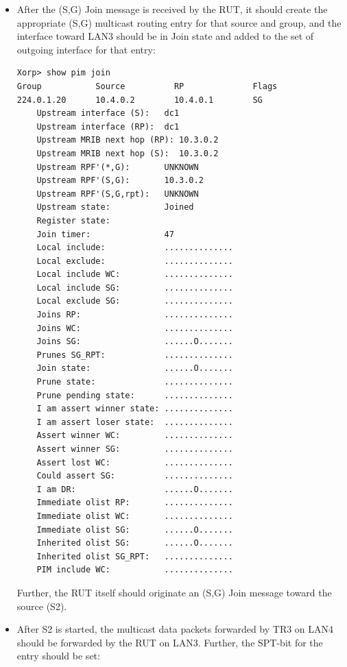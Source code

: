 \documentclass[11pt]{report}
\begin{document}
\begin{itemize}

  \item After the (S,G) Join message is received by the RUT, it
  should create the appropriate (S,G) multicast routing entry for
  that source and group, and the interface toward LAN3 should be in Join state
  and added to the set of outgoing interface for that entry:

\begin{verbatim}
Xorp> show pim join 
Group           Source          RP              Flags
224.0.1.20      10.4.0.2        10.4.0.1        SG   
    Upstream interface (S):   dc1
    Upstream interface (RP):  dc1
    Upstream MRIB next hop (RP): 10.3.0.2
    Upstream MRIB next hop (S):  10.3.0.2
    Upstream RPF'(*,G):       UNKNOWN
    Upstream RPF'(S,G):       10.3.0.2
    Upstream RPF'(S,G,rpt):   UNKNOWN
    Upstream state:           Joined 
    Register state:           
    Join timer:               47
    Local include:            ..............
    Local exclude:            ..............
    Local include WC:         ..............
    Local include SG:         ..............
    Local exclude SG:         ..............
    Joins RP:                 ..............
    Joins WC:                 ..............
    Joins SG:                 ......O.......
    Prunes SG_RPT:            ..............
    Join state:               ......O.......
    Prune state:              ..............
    Prune pending state:      ..............
    I am assert winner state: ..............
    I am assert loser state:  ..............
    Assert winner WC:         ..............
    Assert winner SG:         ..............
    Assert lost WC:           ..............
    Could assert SG:          ..............
    I am DR:                  ......O.......
    Immediate olist RP:       ..............
    Immediate olist WC:       ..............
    Immediate olist SG:       ......O.......
    Inherited olist SG:       ......O.......
    Inherited olist SG_RPT:   ..............
    PIM include WC:           ..............
\end{verbatim}

  Further, the RUT itself should originate an (S,G) Join message
  toward the source (S2).

  \item After S2 is started, the multicast data packets forwarded by TR3
  on LAN4 should be forwarded by the RUT on LAN3. Further, the SPT-bit for the
  entry should be set:


\end{itemize}
\end{document}
